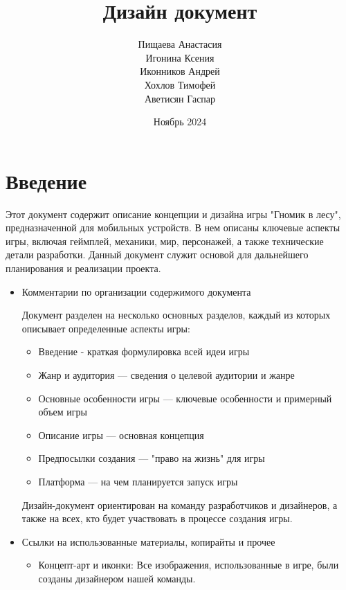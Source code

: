 \documentclass{article}
\title{Дизайн документ}
\author{Пищаева Анастасия \\ Игонина Ксения \\ Иконников Андрей \\ Хохлов Тимофей \\ Аветисян Гаспар}
\date{Ноябрь 2024}
\begin{document}
\maketitle

\tableofcontents
\newpage

\section{Введение}
Этот документ содержит описание концепции и дизайна игры "Гномик в лесу", предназначенной для мобильных устройств. В нем описаны ключевые аспекты игры, включая геймплей, механики, мир, персонажей, а также технические детали разработки. Данный документ служит основой для дальнейшего планирования и реализации проекта.

\begin{itemize}
\item Комментарии по организации содержимого документа

Документ разделен на несколько основных разделов, каждый из которых описывает определенные аспекты игры:
\begin{itemize}

\item Введение - краткая формулировка всей идеи игры

\item Жанр и аудитория — сведения о целевой аудитории и жанре

\item Основные особенности игры — ключевые особенности и примерный объем игры

\item Описание игры — основная концепция

\item Предпосылки создания — "право на жизнь" для игры

\item Платформа — на чем планируется запуск игры
\end{itemize}

Дизайн-документ ориентирован на команду разработчиков и дизайнеров, а также на всех, кто будет участвовать в процессе создания игры.

\item Ссылки на использованные материалы, копирайты и прочее
\begin{itemize}


\item Концепт-арт и иконки: Все изображения, использованные в игре, были созданы дизайнером нашей команды.


\end{itemize}
\end{itemize}
\end{document}
